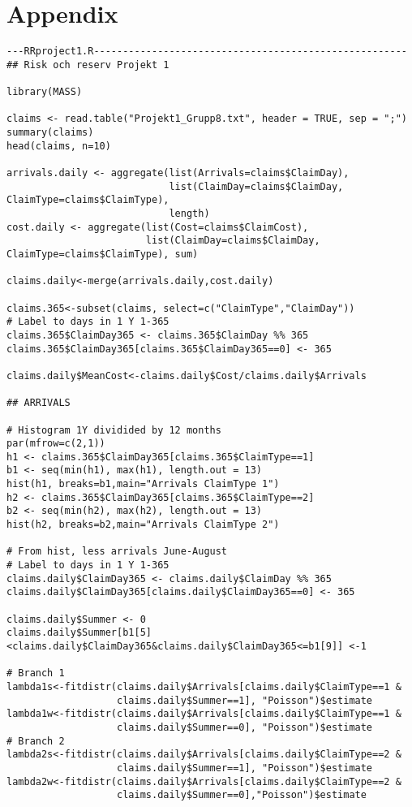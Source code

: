 \documentclass[11pt]{article}
\begin{document}
\section*{Appendix}
\begin{verbatim}
---RRproject1.R------------------------------------------------------
## Risk och reserv Projekt 1

library(MASS)

claims <- read.table("Projekt1_Grupp8.txt", header = TRUE, sep = ";")
summary(claims)
head(claims, n=10)

arrivals.daily <- aggregate(list(Arrivals=claims$ClaimDay),
                            list(ClaimDay=claims$ClaimDay, ClaimType=claims$ClaimType),
                            length)
cost.daily <- aggregate(list(Cost=claims$ClaimCost),
                        list(ClaimDay=claims$ClaimDay, ClaimType=claims$ClaimType), sum)

claims.daily<-merge(arrivals.daily,cost.daily)

claims.365<-subset(claims, select=c("ClaimType","ClaimDay"))
# Label to days in 1 Y 1-365
claims.365$ClaimDay365 <- claims.365$ClaimDay %% 365
claims.365$ClaimDay365[claims.365$ClaimDay365==0] <- 365

claims.daily$MeanCost<-claims.daily$Cost/claims.daily$Arrivals

## ARRIVALS

# Histogram 1Y dividided by 12 months
par(mfrow=c(2,1))
h1 <- claims.365$ClaimDay365[claims.365$ClaimType==1]
b1 <- seq(min(h1), max(h1), length.out = 13)
hist(h1, breaks=b1,main="Arrivals ClaimType 1")
h2 <- claims.365$ClaimDay365[claims.365$ClaimType==2]
b2 <- seq(min(h2), max(h2), length.out = 13)
hist(h2, breaks=b2,main="Arrivals ClaimType 2")

# From hist, less arrivals June-August
# Label to days in 1 Y 1-365
claims.daily$ClaimDay365 <- claims.daily$ClaimDay %% 365
claims.daily$ClaimDay365[claims.daily$ClaimDay365==0] <- 365

claims.daily$Summer <- 0
claims.daily$Summer[b1[5]<claims.daily$ClaimDay365&claims.daily$ClaimDay365<=b1[9]] <-1

# Branch 1
lambda1s<-fitdistr(claims.daily$Arrivals[claims.daily$ClaimType==1 &
                   claims.daily$Summer==1], "Poisson")$estimate
lambda1w<-fitdistr(claims.daily$Arrivals[claims.daily$ClaimType==1 &
                   claims.daily$Summer==0], "Poisson")$estimate
# Branch 2
lambda2s<-fitdistr(claims.daily$Arrivals[claims.daily$ClaimType==2 &
                   claims.daily$Summer==1], "Poisson")$estimate
lambda2w<-fitdistr(claims.daily$Arrivals[claims.daily$ClaimType==2 &
                   claims.daily$Summer==0],"Poisson")$estimate


\end{verbatim}
\end{document}

